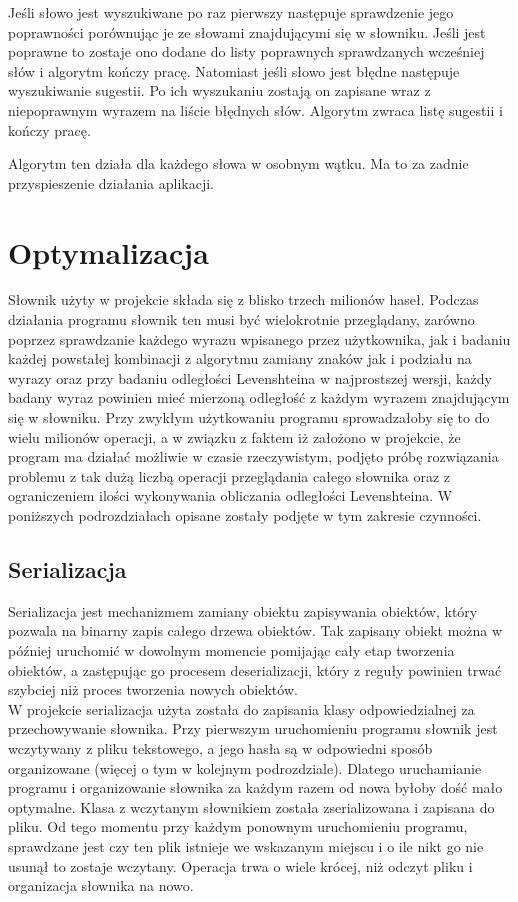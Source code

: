 Jeśli słowo jest wyszukiwane po raz pierwszy następuje sprawdzenie jego poprawności porównując je ze słowami znajdującymi się w słowniku. Jeśli jest poprawne to zostaje ono dodane do listy poprawnych sprawdzanych wcześniej słów i algorytm kończy pracę. Natomiast jeśli słowo jest błędne następuje wyszukiwanie sugestii. Po ich wyszukaniu zostają on zapisane wraz z niepoprawnym wyrazem na liście błędnych słów. Algorytm zwraca listę sugestii i kończy pracę.

Algorytm ten działa dla każdego słowa w osobnym wątku. Ma to za zadnie przyspieszenie działania aplikacji.  

\section{Optymalizacja}
\label{chap:optym}
Słownik użyty w projekcie składa się z blisko trzech milionów haseł. Podczas działania programu słownik ten musi być wielokrotnie przeglądany, zarówno poprzez sprawdzanie każdego wyrazu wpisanego przez użytkownika, jak i badaniu każdej powstałej kombinacji z algorytmu zamiany znaków jak i podziału na wyrazy oraz przy badaniu odległości Levenshteina w najprostszej wersji, każdy badany wyraz powinien mieć mierzoną odległość z każdym wyrazem znajdującym się w słowniku. Przy zwykłym użytkowaniu programu sprowadzałoby się to do wielu milionów operacji, a w związku z faktem iż założono w projekcie, że program ma działać możliwie w czasie rzeczywistym, podjęto próbę rozwiązania problemu z tak dużą liczbą operacji przeglądania całego słownika oraz z ograniczeniem ilości wykonywania obliczania odległości Levenshteina. W poniższych podrozdziałach opisane zostały podjęte w tym zakresie czynności.

\subsection{Serializacja}
Serializacja jest mechanizmem zamiany obiektu zapisywania obiektów, który pozwala na binarny zapis całego drzewa obiektów. Tak zapisany obiekt można w później uruchomić w dowolnym momencie pomijając cały etap tworzenia obiektów, a zastępując go procesem deserializacji, który z reguły powinien trwać szybciej niż proces tworzenia nowych obiektów. \\

W projekcie serializacja użyta została do zapisania klasy odpowiedzialnej za przechowywanie słownika. Przy pierwszym uruchomieniu programu słownik jest wczytywany z pliku tekstowego, a jego hasła są w odpowiedni sposób organizowane (więcej o tym w kolejnym podrozdziale). Dlatego uruchamianie programu i organizowanie słownika za każdym razem od nowa byłoby dość mało optymalne. Klasa z wczytanym słownikiem została zserializowana i zapisana do pliku. Od tego momentu przy każdym ponownym uruchomieniu programu, sprawdzane jest czy ten plik istnieje we wskazanym miejscu i o ile nikt go nie usunął to zostaje wczytany. Operacja trwa o wiele krócej, niż odczyt pliku i organizacja słownika na nowo. \\


